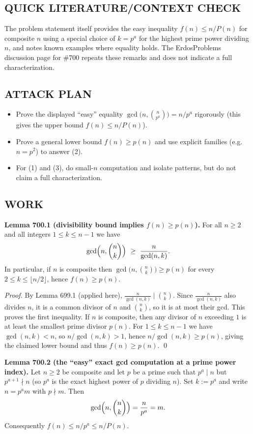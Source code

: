\subsection*{QUICK LITERATURE/CONTEXT CHECK}
The problem statement itself provides the easy inequality $f(n)\le n/P(n)$ for composite $n$ using a special choice of $k=p^a$ for the highest prime power dividing $n$, and notes known examples where equality holds. The ErdosProblems discussion page for \#700 repeats these remarks and does not indicate a full characterization.

\subsection*{ATTACK PLAN}
\begin{itemize}
\item Prove the displayed ``easy'' equality $\gcd\bigl(n,\binom{n}{p^a}\bigr)=n/p^a$ rigorously (this gives the upper bound $f(n)\le n/P(n)$).
\item Prove a general lower bound $f(n)\ge p(n)$ and use explicit families (e.g. $n=p^2$) to answer (2).
\item For (1) and (3), do small-$n$ computation and isolate patterns, but do not claim a full characterization.
\end{itemize}

\subsection*{WORK}
\textbf{Lemma 700.1 (divisibility bound implies $f(n)\ge p(n)$).}
For all $n\ge 2$ and all integers $1\le k\le n-1$ we have
\[\gcd\Bigl(n,\binom{n}{k}\Bigr)\ \ge\ \frac{n}{\gcd(n,k)}.
\]
In particular, if $n$ is composite then $\gcd\bigl(n,\binom{n}{k}\bigr)\ge p(n)$ for every $2\le k\le \lfloor n/2\rfloor$, hence $f(n)\ge p(n)$.

\emph{Proof.}
By Lemma 699.1 (applied here), $\frac{n}{\gcd(n,k)}\mid \binom{n}{k}$. Since $\frac{n}{\gcd(n,k)}$ also divides $n$, it is a common divisor of $n$ and $\binom{n}{k}$, so it is at most their gcd. This proves the first inequality.
If $n$ is composite, then any divisor of $n$ exceeding $1$ is at least the smallest prime divisor $p(n)$. For $1\le k\le n-1$ we have $\gcd(n,k)<n$, so $n/\gcd(n,k)>1$, hence $n/\gcd(n,k)\ge p(n)$, giving the claimed lower bound and thus $f(n)\ge p(n)$. \qed

\medskip
\textbf{Lemma 700.2 (the ``easy'' exact gcd computation at a prime power index).}
Let $n\ge 2$ be composite and let $p$ be a prime such that $p^a\mid n$ but $p^{a+1}\nmid n$ (so $p^a$ is the exact highest power of $p$ dividing $n$). Set $k:=p^a$ and write $n=p^a m$ with $p\nmid m$. Then
\[\gcd\Bigl(n,\binom{n}{k}\Bigr)=\frac{n}{p^a}=m.
\]
Consequently $f(n)\le n/p^a\le n/P(n)$.

